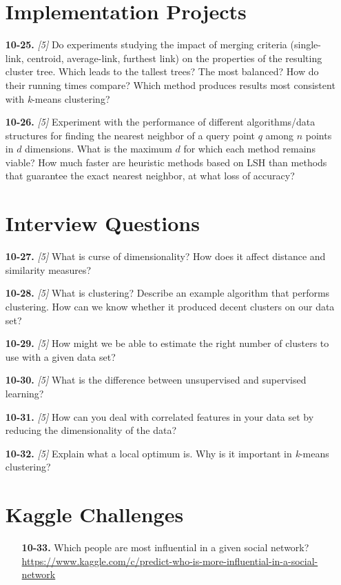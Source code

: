 \documentclass[10pt]{article}
\begin{document}
\begin{enumerate}
\section*{Implementation Projects}
  \item[\textbf{10-25.}] \textit{[5]} Do experiments studying the impact of merging criteria (single-link, centroid, average-link, furthest link) on the properties of the resulting cluster tree. Which leads to the tallest trees? The most balanced? How do their running times compare? Which method produces results most consistent with \textit{k}-means clustering?
  \item[\textbf{10-26.}] \textit{[5]} Experiment with the performance of different algorithms/data structures for finding the nearest neighbor of a query point $q$ among $n$ points in $d$ dimensions. What is the maximum $d$ for which each method remains viable? How much faster are heuristic methods based on LSH than methods that guarantee the exact nearest neighbor, at what loss of accuracy?
  
\section*{Interview Questions}
  \item[\textbf{10-27.}] \textit{[5]} What is curse of dimensionality? How does it affect distance and similarity measures?
  \item[\textbf{10-28.}] \textit{[5]} What is clustering? Describe an example algorithm that performs clustering. How can we know whether it produced decent clusters on our data set?
  \item[\textbf{10-29.}] \textit{[5]} How might we be able to estimate the right number of clusters to use with a given data set?
  \item[\textbf{10-30.}] \textit{[5]} What is the difference between unsupervised and supervised learning?
  \item[\textbf{10-31.}] \textit{[5]} How can you deal with correlated features in your data set by reducing the dimensionality of the data?
  \item[\textbf{10-32.}] \textit{[5]} Explain what a local optimum is. Why is it important in \textit{k}-means clustering?
  
\section*{Kaggle Challenges}
\begin{enumerate}
  \item[\textbf{10-33.}] Which people are most influential in a given social network? 
  \href{https://www.kaggle.com/c/predict-who-is-more-influential-in-a-social-network}{https://www.kaggle.com/c/predict-who-is-more-influential-in-a-social-network}


\end{enumerate}
\end{enumerate}
\end{document}
